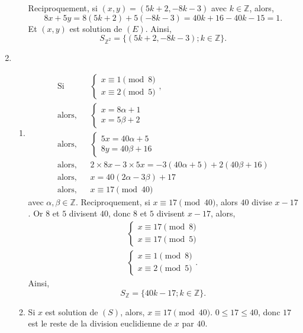 \documentclass[a4paper]{article}
\begin{document}
\begin{enumerate}
\begin{enumerate}
	Reciproquement, si  $(x,y)=(5k+2,-8k-3)$ avec $k\in\mathbb{Z}$, alors,
	 \[
		 8x+5y=8(5k+2)+5(-8k-3)=40k+16-40k-15=1
	 .\] Et $(x,y)$ est solution de $(E)$. Ainsi,
	 $$S_{\mathbb{Z}^2}=\Big\{(5k+2,-8k-3);k\in\mathbb{Z}\Big\}.$$
\end{enumerate}
\item	\begin{enumerate}
		\item	\begin{align*}
				\text{Si}\;\;\;&\begin{cases}
					x\equiv 1\pmod 8\\
					x\equiv 2\pmod 5
				\end{cases},\\
				\text{alors,}\;\;\;&\begin{cases}
					x=8\alpha+1\\
					x=5\beta+2
				\end{cases}\\
				\text{alors,}\;\;\;&\begin{cases}
					5x=40\alpha+5\\
					8y=40\beta+16
				\end{cases}\\
					\text{alors,}\;\;\;&2\times 8x-3 \times 5x=-3(40\alpha+5)+2(40\beta+16)\\
					\text{alors,}\;\;\;&x=40(2\alpha-3\beta)+17\\
					\text{alors,}\;\;\;&x\equiv 17 \pmod{40}
			\end{align*}
			avec $\alpha,\beta\in\mathbb{Z}$. Reciproquement, si $x\equiv 17 \pmod{40}$, alors $40$ divise $x-17$. Or $8$ et $5$ divisent $40$, donc $8$ et $5$ divisent $x-17$, alors, 
			\begin{align*}
				\begin{cases}
					x\equiv 17 \pmod 8 \\
					x\equiv 17 \pmod 5
				\end{cases}\\
				\begin{cases}
					x\equiv 1 \pmod 8\\
					x\equiv 2 \pmod 5
				\end{cases}.
			\end{align*}
			Ainsi, \[
				S_{\mathbb{Z}}=\{40k-17;k\in\mathbb{Z}\}
			.\] 
		\item Si $x$ est solution de  $(S)$, alors, $x\equiv 17 \pmod{40}$. $0\leq 17\leq 40$, donc $17$ est le reste de la division euclidienne de $x$ par $40$.
	\end{enumerate}

\end{enumerate}
\end{document}
